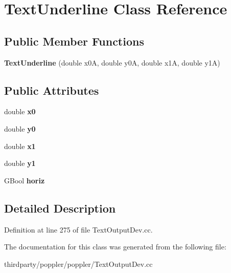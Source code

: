 \hypertarget{class_text_underline}{}\section{Text\+Underline Class Reference}
\label{class_text_underline}
\subsection*{Public Member Functions}
\begin{DoxyCompactItemize}
\item 
\mbox{\label{class_text_underline_aab104bfebc71a0e9e65a3d03654b4646}} 
{\bfseries Text\+Underline} (double x0A, double y0A, double x1A, double y1A)
\end{DoxyCompactItemize}
\subsection*{Public Attributes}
\begin{DoxyCompactItemize}
\item 
\mbox{\label{class_text_underline_a7e35fee0ae075a2da22ca2fccc41c44d}} 
double {\bfseries x0}
\item 
\mbox{\label{class_text_underline_a4968095a6f24d40588b0752b2f2bcef4}} 
double {\bfseries y0}
\item 
\mbox{\label{class_text_underline_ae51a406b23f5f0db6dcab1fd584a1545}} 
double {\bfseries x1}
\item 
\mbox{\label{class_text_underline_a5828b29c94409ebeb331d27a858968bf}} 
double {\bfseries y1}
\item 
\mbox{\label{class_text_underline_a015f5df84d5a22b41c03c094a941936b}} 
G\+Bool {\bfseries horiz}
\end{DoxyCompactItemize}


\subsection{Detailed Description}


Definition at line 275 of file Text\+Output\+Dev.\+cc.



The documentation for this class was generated from the following file\+:\begin{DoxyCompactItemize}
\item 
thirdparty/poppler/poppler/Text\+Output\+Dev.\+cc\end{DoxyCompactItemize}
